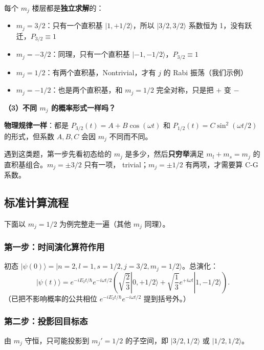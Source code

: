 每个 $m_j$ 楼层都是\textbf{独立求解}的：
\begin{itemize}[nosep]
    \item $m_j=3/2$：只有一个直积基 $|1,+1/2\rangle$，所以 $|3/2,3/2\rangle$ 系数恒为 1，没有跃迁，$P_{3/2}\equiv 1$
    \item $m_j=-3/2$：同理，只有一个直积基 $|-1,-1/2\rangle$，$P_{3/2}\equiv 1$
    \item $m_j=1/2$：有两个直积基，Nontrivial，才有 $j$ 的 Rabi 振荡（我们示例）
    \item $m_j=-1/2$：也是两个直积基，和 $m_j=1/2$ 完全对称，只是把 $+$ 变 $-$
\end{itemize}

\textbf{（3）不同 $m_j$ 的概率形式一样吗？}

\textbf{物理规律一样}：都是 $P_{3/2}(t) = A + B\cos(\omega t)$ 和 $P_{1/2}(t) = C\sin^2(\omega t/2)$ 的形式，但系数 $A, B, C$ 会因 $m_j$ 不同而不同。

\begin{insightbox}[考场速判]
遇到这类题，第一步先看初态给的 $m_j$ 是多少，然后\textbf{只穷举}满足 $m_l+m_s=m_j$ 的直积基组合。$m_j=\pm 3/2$ 只有一项， trivial；$m_j=\pm 1/2$ 有两项，才需要算 C-G 系数。
\end{insightbox}

\subsection{标准计算流程}

下面以 $m_j=1/2$ 为例完整走一遍（其他 $m_j$ 同理）。

\subsubsection{第一步：时间演化算符作用}

初态 $|\psi(0)\rangle = |n=2, l=1, s=1/2, j=3/2, m_j=1/2\rangle$。总演化：
\[
|\psi(t)\rangle = e^{-iE_2 t/\hbar} e^{-i\omega t/2} \left( \sqrt{\frac{2}{3}} |0,+1/2\rangle + \sqrt{\frac{1}{3}} e^{+i\omega t} |1,-1/2\rangle \right).
\]
（已把不影响概率的公共相位 $e^{-iE_2 t/\hbar}e^{-i\omega t/2}$ 提到括号外。）

\subsubsection{第二步：投影回目标态}

由 $m_j$ 守恒，只可能投影到 $m_j'=1/2$ 的子空间，即 $|3/2,1/2\rangle$ 或 $|1/2,1/2\rangle$。

